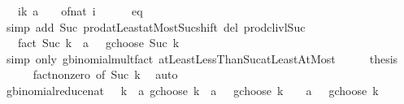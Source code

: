 \begin{isabellebody}
\ {\isachardoublequoteopen}{\isasymdots}\ {\isacharequal}{\kern0pt}\ {\isacharparenleft}{\kern0pt}{\isasymProd}i{\isasymin}{\isacharbraceleft}{\kern0pt}{}{\isachardot}{\kern0pt}{\isachardot}{\kern0pt}k{\isacharbraceright}{\kern0pt}{\isachardot}{\kern0pt}\ {\isacharparenleft}{\kern0pt}a\ {\isacharplus}{\kern0pt}\ {}{\isacharparenright}{\kern0pt}\ {\isacharminus}{\kern0pt}\ of{\isacharunderscore}{\kern0pt}nat\ i{\isacharparenright}{\kern0pt}{\isachardoublequoteclose}\isanewline
\ \ \ \ \isamarkupfalse%
\ eq{}\isanewline
\ \ \ \ \isamarkupfalse%
\ {\isacharparenleft}{\kern0pt}simp\ add{\isacharcolon}{\kern0pt}\ Suc\ prod{\isachardot}{\kern0pt}atLeast{}{\isacharunderscore}{\kern0pt}atMost{\isacharunderscore}{\kern0pt}Suc{\isacharunderscore}{\kern0pt}shift\ del{\isacharcolon}{\kern0pt}\ prod{\isachardot}{\kern0pt}cl{\isacharunderscore}{\kern0pt}ivl{\isacharunderscore}{\kern0pt}Suc{\isacharparenright}{\kern0pt}\isanewline
\ \ \isamarkupfalse%
\ \isamarkupfalse%
\ {\isachardoublequoteopen}{\isasymdots}\ {\isacharequal}{\kern0pt}\ {\isacharparenleft}{\kern0pt}fact\ {\isacharparenleft}{\kern0pt}Suc\ k{\isacharparenright}{\kern0pt}{\isacharparenright}{\kern0pt}\ {\isacharasterisk}{\kern0pt}\ {\isacharparenleft}{\kern0pt}{\isacharparenleft}{\kern0pt}a\ {\isacharplus}{\kern0pt}\ {}{\isacharparenright}{\kern0pt}\ gchoose\ {\isacharparenleft}{\kern0pt}Suc\ k{\isacharparenright}{\kern0pt}{\isacharparenright}{\kern0pt}{\isachardoublequoteclose}\isanewline
\ \ \ \ \isamarkupfalse%
\ {\isacharparenleft}{\kern0pt}simp\ only{\isacharcolon}{\kern0pt}\ gbinomial{\isacharunderscore}{\kern0pt}mult{\isacharunderscore}{\kern0pt}fact\ atLeastLessThanSuc{\isacharunderscore}{\kern0pt}atLeastAtMost{\isacharparenright}{\kern0pt}\isanewline
\ \ \isamarkupfalse%
\ \isamarkupfalse%
\ {\isacharquery}{\kern0pt}thesis\isanewline
\ \ \ \ \isamarkupfalse%
\ fact{\isacharunderscore}{\kern0pt}nonzero\ {\isacharbrackleft}{\kern0pt}of\ {\isachardoublequoteopen}Suc\ k{\isachardoublequoteclose}{\isacharbrackright}{\kern0pt}\ \isamarkupfalse%
\ auto\isanewline
{}\isamarkupfalse%
%
\endisatagproof
{\isafoldproof}%
%
\isadelimproof
\isanewline
%
\endisadelimproof
\isanewline
{}\isamarkupfalse%
\ gbinomial{\isacharunderscore}{\kern0pt}reduce{\isacharunderscore}{\kern0pt}nat{\isacharcolon}{\kern0pt}\ {\isachardoublequoteopen}{}\ {\isacharless}{\kern0pt}\ k\ {\isasymLongrightarrow}\ a\ gchoose\ k\ {\isacharequal}{\kern0pt}\ {\isacharparenleft}{\kern0pt}a\ {\isacharminus}{\kern0pt}\ {}{\isacharparenright}{\kern0pt}\ gchoose\ {\isacharparenleft}{\kern0pt}k\ {\isacharminus}{\kern0pt}\ {}{\isacharparenright}{\kern0pt}\ {\isacharplus}{\kern0pt}\ {\isacharparenleft}{\kern0pt}{\isacharparenleft}{\kern0pt}a\ {\isacharminus}{\kern0pt}\ {}{\isacharparenright}{\kern0pt}\ gchoose\ k{\isacharparenright}{\kern0pt}{\isachardoublequoteclose}\isanewline

\end{isabellebody}
